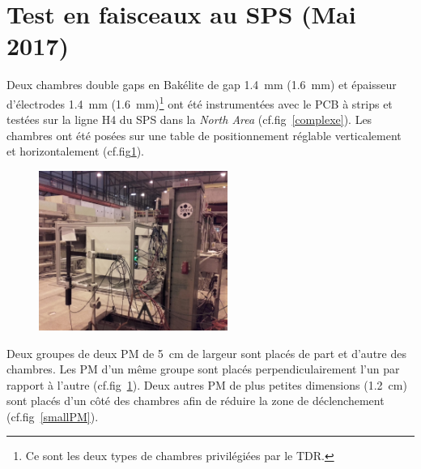 \section{Test en faisceaux au SPS (Mai 2017)}
\vspace{-0.4cm}
Deux chambres double gaps en Bakélite de gap \SI{1.4}{\milli\meter} (\SI{1.6}{\milli\meter}) et épaisseur d'électrodes \SI{1.4}{\milli\meter} (\SI{1.6}{\milli\meter})\footnote{Ce sont les deux types de chambres privilégiées par le TDR.} ont été instrumentées avec le PCB à strips et testées sur la ligne H4 du SPS dans la \textit{North Area} (cf.fig~\ref{complexe}). Les chambres ont été posées sur une table de positionnement réglable verticalement et horizontalement (cf.fig\ref{setup2017}).
\begin{figure}[ht!]
	\centering
	\includegraphics[width=0.55\textwidth]{ELE/setup2017.jpg}
	\label{setup2017}
\end{figure}

Deux groupes de deux PM de \SI{5}{\centi\meter} de largeur sont placés de part et d'autre des chambres. Les PM d'un même groupe sont placés perpendiculairement l'un par rapport à l'autre (cf.fig~\ref{setup2017}). Deux autres PM de plus petites dimensions (\SI{1.2}{\centi\meter}) sont placés d'un côté des chambres afin de réduire la zone de déclenchement (cf.fig~\ref{smallPM}).  

